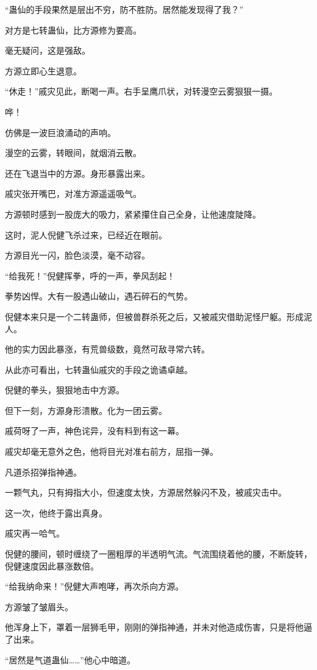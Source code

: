 \begin{this_body}
“蛊仙的手段果然是层出不穷，防不胜防。居然能发现得了我？”

对方是七转蛊仙，比方源修为要高。

毫无疑问，这是强敌。

方源立即心生退意。

“休走！”戚灾见此，断喝一声。右手呈鹰爪状，对转漫空云雾狠狠一摄。

哗！

仿佛是一波巨浪涌动的声响。

漫空的云雾，转眼间，就烟消云散。

还在飞退当中的方源。身形暴露出来。

戚灾张开嘴巴，对准方源遥遥吸气。

方源顿时感到一股庞大的吸力，紧紧攥住自己全身，让他速度陡降。

这时，泥人倪健飞杀过来，已经近在眼前。

方源目光一闪，脸色淡漠，毫不动容。

“给我死！”倪健挥拳，呼的一声，拳风刮起！

拳势凶悍。大有一股遇山破山，遇石碎石的气势。

倪健本来只是一个二转蛊师，但被兽群杀死之后，又被戚灾借助泥怪尸躯。形成泥人。

他的实力因此暴涨，有荒兽级数，竟然可敌寻常六转。

从此亦可看出，七转蛊仙戚灾的手段之诡谲卓越。

倪健的拳头，狠狠地击中方源。

但下一刻，方源身形溃散。化为一团云雾。

戚荷呀了一声，神色诧异，没有料到有这一幕。

戚灾却毫无意外之色，他将目光对准右前方，屈指一弹。

凡道杀招弹指神通。

一颗气丸，只有拇指大小，但速度太快，方源居然躲闪不及，被戚灾击中。

这一次，他终于露出真身。

戚灾再一哈气。

倪健的腰间，顿时缠绕了一圈粗厚的半透明气流。气流围绕着他的腰，不断旋转，倪健速度因此暴涨数倍。

“给我纳命来！”倪健大声咆哮，再次杀向方源。

方源皱了皱眉头。

他浑身上下，罩着一层狮毛甲，刚刚的弹指神通，并未对他造成伤害，只是将他逼了出来。

“居然是气道蛊仙……”他心中暗道。


\end{this_body}
